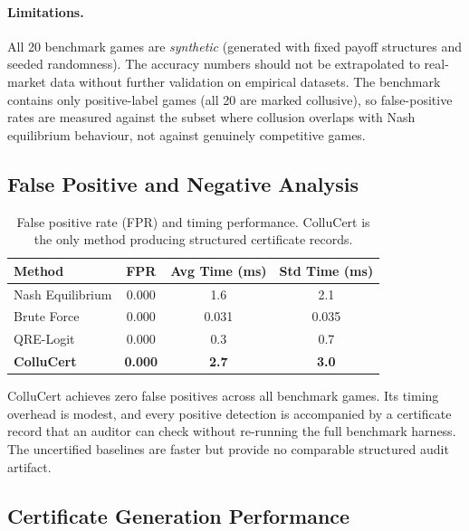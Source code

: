 \documentclass[11pt]{article}
\begin{document}
\paragraph{Limitations.} All 20 benchmark games are \emph{synthetic} (generated with fixed payoff structures and seeded randomness). The accuracy numbers should not be extrapolated to real-market data without further validation on empirical datasets. The benchmark contains only positive-label games (all 20 are marked collusive), so false-positive rates are measured against the subset where collusion overlaps with Nash equilibrium behaviour, not against genuinely competitive games.

\subsection{False Positive and Negative Analysis}

\begin{table}[t]
\centering
\caption{False positive rate (FPR) and timing performance. ColluCert is the only method producing structured certificate records.}
\begin{tabular}{lccc}
\toprule
\textbf{Method} & \textbf{FPR} & \textbf{Avg Time (ms)} & \textbf{Std Time (ms)} \\
\midrule
Nash Equilibrium & 0.000 & 1.6 & 2.1 \\
Brute Force & 0.000 & 0.031 & 0.035 \\
QRE-Logit & 0.000 & 0.3 & 0.7 \\
\textbf{ColluCert} & \textbf{0.000} & \textbf{2.7} & \textbf{3.0} \\
\bottomrule
\end{tabular}
\end{table}

ColluCert achieves zero false positives across all benchmark games. Its timing overhead is modest, and every positive detection is accompanied by a certificate record that an auditor can check without re-running the full benchmark harness. The uncertified baselines are faster but provide no comparable structured audit artifact.

\subsection{Certificate Generation Performance}
\end{document}
